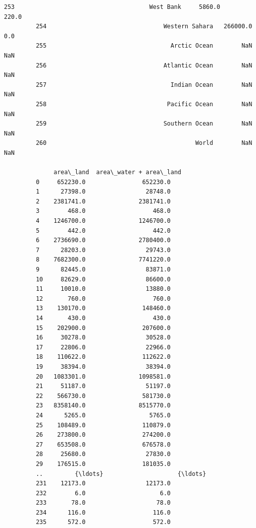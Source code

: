 \documentclass[11pt]{article}
\begin{document}
\begin{Verbatim}[commandchars=\\\{\}]
         253                                      West Bank     5860.0       220.0   
         254                                 Western Sahara   266000.0         0.0   
         255                                   Arctic Ocean        NaN         NaN   
         256                                 Atlantic Ocean        NaN         NaN   
         257                                   Indian Ocean        NaN         NaN   
         258                                  Pacific Ocean        NaN         NaN   
         259                                 Southern Ocean        NaN         NaN   
         260                                          World        NaN         NaN   
         
              area\_land  area\_water + area\_land  
         0     652230.0                652230.0  
         1      27398.0                 28748.0  
         2    2381741.0               2381741.0  
         3        468.0                   468.0  
         4    1246700.0               1246700.0  
         5        442.0                   442.0  
         6    2736690.0               2780400.0  
         7      28203.0                 29743.0  
         8    7682300.0               7741220.0  
         9      82445.0                 83871.0  
         10     82629.0                 86600.0  
         11     10010.0                 13880.0  
         12       760.0                   760.0  
         13    130170.0                148460.0  
         14       430.0                   430.0  
         15    202900.0                207600.0  
         16     30278.0                 30528.0  
         17     22806.0                 22966.0  
         18    110622.0                112622.0  
         19     38394.0                 38394.0  
         20   1083301.0               1098581.0  
         21     51187.0                 51197.0  
         22    566730.0                581730.0  
         23   8358140.0               8515770.0  
         24      5265.0                  5765.0  
         25    108489.0                110879.0  
         26    273800.0                274200.0  
         27    653508.0                676578.0  
         28     25680.0                 27830.0  
         29    176515.0                181035.0  
         ..         {\ldots}                     {\ldots}  
         231    12173.0                 12173.0  
         232        6.0                     6.0  
         233       78.0                    78.0  
         234      116.0                   116.0  
         235      572.0                   572.0  

\end{Verbatim}
\end{document}
